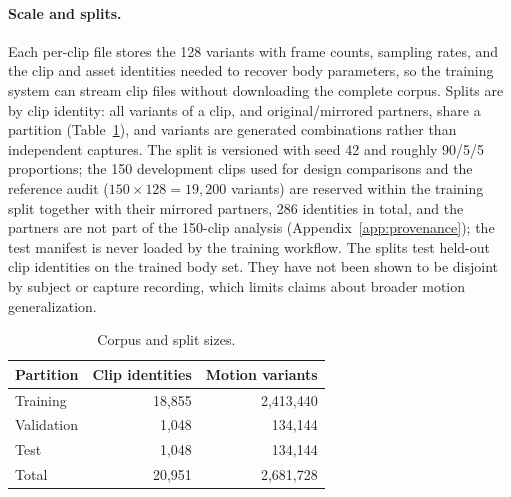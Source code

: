 \paragraph{Scale and splits.}
Each per-clip file stores the 128 variants with frame counts, sampling rates,
and the clip and asset identities needed to recover body parameters, so the
training system can stream clip files without downloading the complete corpus.
Splits are by clip identity: all variants of a clip, and original/mirrored
partners, share a partition (Table~\ref{tab:dataset_counts}), and variants are
generated combinations rather than independent captures. The split is versioned
with seed 42 and roughly 90/5/5 proportions; the 150 development clips used for
design comparisons and the reference audit ($150\times128=19{,}200$ variants)
are reserved within the training split together with their mirrored partners,
286 identities in total, and the partners are not part of the 150-clip analysis
(Appendix~\ref{app:provenance}); the test manifest is never loaded by
the training workflow. The splits test held-out clip identities on the trained
body set. They have not been shown to be disjoint by subject or capture
recording, which limits claims about broader motion generalization.

\begin{table}[!htb]
\centering
\caption{Corpus and split sizes.}\label{tab:dataset_counts}
\begin{tabular}{lrr}
\toprule
Partition & Clip identities & Motion variants \\
\midrule
Training & 18,855 & 2,413,440 \\
Validation & 1,048 & 134,144 \\
Test & 1,048 & 134,144 \\
\midrule
Total & 20,951 & 2,681,728 \\
\bottomrule
\end{tabular}
\end{table}
